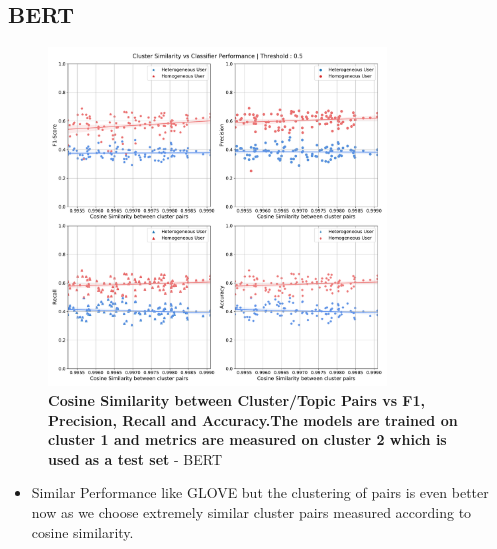 \documentclass[a4paper,fontsize=8.0pt]{scrartcl}
\begin{document}
\subsection{BERT}
\vspace{-5ex}
\begin{figure}[H]
 \centering
 \includegraphics[width=0.8\textwidth]{Graphs/BERT/cluster_sim_vs_model_perf_5.pdf}
 \caption{\textbf{Cosine Similarity between Cluster/Topic Pairs vs F1, Precision, Recall and Accuracy.The models are trained on cluster 1 and metrics are measured on cluster 2 which is used as a test set} - BERT}
\end{figure}
\begin{flushleft}
\begin{itemize}
    \item Similar Performance like GLOVE but the clustering of pairs is even better now as we choose extremely similar cluster pairs measured according to cosine similarity.
\end{itemize}
\end{flushleft}


\vspace{-1ex}
\end{document}
